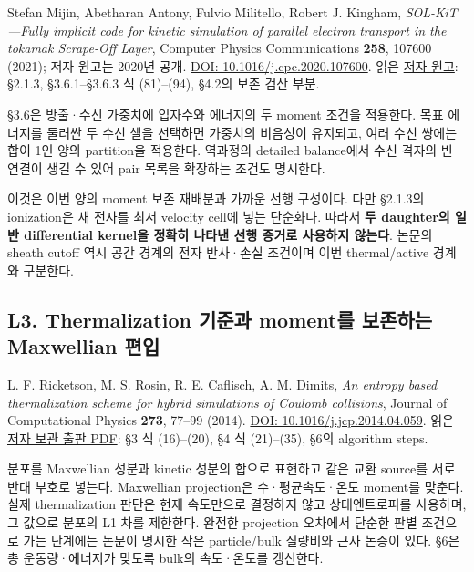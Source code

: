 \documentclass[11pt,a4paper]{article}
\begin{document}
Stefan Mijin, Abetharan Antony, Fulvio Militello, Robert J. Kingham, \emph{SOL-KiT---Fully implicit code for kinetic simulation of parallel electron transport in the tokamak Scrape-Off Layer}, Computer Physics Communications \textbf{258}, 107600 (2021); 저자 원고는 2020년 공개. \href{https://doi.org/10.1016/j.cpc.2020.107600}{DOI: 10.1016/j.cpc.2020.107600}. 읽은 \href{https://ar5iv.labs.arxiv.org/html/2003.00769}{저자 원고}: §2.1.3, §3.6.1--§3.6.3 식 (81)--(94), §4.2의 보존 검산 부분.

§3.6은 방출·수신 가중치에 입자수와 에너지의 두 moment 조건을 적용한다. 목표 에너지를 둘러싼 두 수신 셀을 선택하면 가중치의 비음성이 유지되고, 여러 수신 쌍에는 합이 1인 양의 partition을 적용한다. 역과정의 detailed balance에서 수신 격자의 빈 연결이 생길 수 있어 pair 목록을 확장하는 조건도 명시한다.

이것은 이번 양의 moment 보존 재배분과 가까운 선행 구성이다. 다만 §2.1.3의 ionization은 새 전자를 최저 velocity cell에 넣는 단순화다. 따라서 \textbf{두 daughter의 일반 differential kernel을 정확히 나타낸 선행 증거로 사용하지 않는다}. 논문의 sheath cutoff 역시 공간 경계의 전자 반사·손실 조건이며 이번 thermal/active 경계와 구분한다.

\hypertarget{l3.-thermalization-uxae30uxc900uxacfc-momentuxb97c-uxbcf4uxc874uxd558uxb294-maxwellian-uxd3b8uxc785}{%
\subsection{L3. Thermalization 기준과 moment를 보존하는 Maxwellian 편입}\label{l3.-thermalization-uxae30uxc900uxacfc-momentuxb97c-uxbcf4uxc874uxd558uxb294-maxwellian-uxd3b8uxc785}}

L. F. Ricketson, M. S. Rosin, R. E. Caflisch, A. M. Dimits, \emph{An entropy based thermalization scheme for hybrid simulations of Coulomb collisions}, Journal of Computational Physics \textbf{273}, 77--99 (2014). \href{https://doi.org/10.1016/j.jcp.2014.04.059}{DOI: 10.1016/j.jcp.2014.04.059}. 읽은 \href{https://www.math.ucla.edu/~caflisch/Pubs/Pubs2013-2014/RicketsonEntropyHybridJCP2014.pdf}{저자 보관 출판 PDF}: §3 식 (16)--(20), §4 식 (21)--(35), §6의 algorithm steps.

분포를 Maxwellian 성분과 kinetic 성분의 합으로 표현하고 같은 교환 source를 서로 반대 부호로 넣는다. Maxwellian projection은 수·평균속도·온도 moment를 맞춘다. 실제 thermalization 판단은 현재 속도만으로 결정하지 않고 상대엔트로피를 사용하며, 그 값으로 분포의 L1 차를 제한한다. 완전한 projection 오차에서 단순한 판별 조건으로 가는 단계에는 논문이 명시한 작은 particle/bulk 질량비와 근사 논증이 있다. §6은 총 운동량·에너지가 맞도록 bulk의 속도·온도를 갱신한다.
\end{document}
